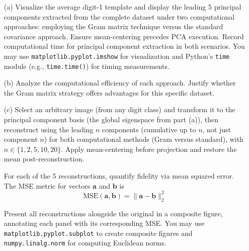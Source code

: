 \documentclass[11pt,addpoints,answers]{exam}
\begin{document}
\begin{enumerate}
		
		\begin{enumerate}
			\item[(a)] Visualize the average digit-1 template and display the leading 5 principal components extracted from the complete dataset under two computational approaches: employing the Gram matrix technique versus the standard covariance approach.  
			Ensure mean-centering precedes PCA execution. Record computational time for principal component extraction in both scenarios. You may use \texttt{matplotlib.pyplot.imshow} for visualization and Python's \texttt{time} module (e.g., \texttt{time.time()}) for timing measurements.
			
			\item[(b)] Analyze the computational efficiency of each approach. Justify whether the Gram matrix strategy offers advantages for this specific dataset.
			
			\item[(c)] Select an arbitrary image (from any digit class) and transform it to the principal component basis (the global eigenspace from part (a)), then reconstruct using the leading $n$ components (cumulative up to $n$, not just component $n$) for both computational methods (Gram versus standard), with $n \in \{1, 2, 5, 10, 20\}$. Apply mean-centering before projection and restore the mean post-reconstruction.
			
			For each of the 5 reconstructions, quantify fidelity via mean squared error. The MSE metric for vectors $\mathbf{a}$ and $\mathbf{b}$ is 
			\[
			\text{MSE}(\mathbf{a}, \mathbf{b}) = \|\mathbf{a} - \mathbf{b}\|_{2}^{2}
			\]
			
			Present all reconstructions alongside the original in a composite figure, annotating each panel with its corresponding MSE. You may use \texttt{matplotlib.pyplot.subplot} to create composite figures and \texttt{numpy.linalg.norm} for computing Euclidean norms.
		\end{enumerate}
		
	\end{enumerate}
	
	\clearpage
	
	
\end{document}
